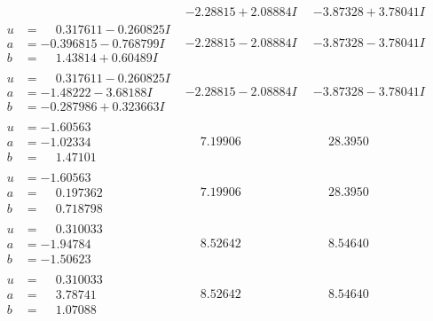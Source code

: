 \documentclass[1p]{elsarticle_modified}
\theoremstyle{definition}
\begin{document}
$$\begin{array}{c|c|c}
 & -2.28815 + 2.08884 I & -3.87328 + 3.78041 I \\ \hline\begin{aligned}
u &= \phantom{-}0.317611 - 0.260825 I \\
a &= -0.396815 - 0.768799 I \\
b &= \phantom{-}1.43814 + 0.60489 I\end{aligned}
 & -2.28815 - 2.08884 I & -3.87328 - 3.78041 I \\ \hline\begin{aligned}
u &= \phantom{-}0.317611 - 0.260825 I \\
a &= -1.48222 - 3.68188 I \\
b &= -0.287986 + 0.323663 I\end{aligned}
 & -2.28815 - 2.08884 I & -3.87328 - 3.78041 I \\ \hline\begin{aligned}
u &= -1.60563\phantom{ +0.000000I} \\
a &= -1.02334\phantom{ +0.000000I} \\
b &= \phantom{-}1.47101\phantom{ +0.000000I}\end{aligned}
 & \phantom{-}7.19906\phantom{ +0.000000I} & \phantom{-}28.3950\phantom{ +0.000000I} \\ \hline\begin{aligned}
u &= -1.60563\phantom{ +0.000000I} \\
a &= \phantom{-}0.197362\phantom{ +0.000000I} \\
b &= \phantom{-}0.718798\phantom{ +0.000000I}\end{aligned}
 & \phantom{-}7.19906\phantom{ +0.000000I} & \phantom{-}28.3950\phantom{ +0.000000I} \\ \hline\begin{aligned}
u &= \phantom{-}0.310033\phantom{ +0.000000I} \\
a &= -1.94784\phantom{ +0.000000I} \\
b &= -1.50623\phantom{ +0.000000I}\end{aligned}
 & \phantom{-}8.52642\phantom{ +0.000000I} & \phantom{-}8.54640\phantom{ +0.000000I} \\ \hline\begin{aligned}
u &= \phantom{-}0.310033\phantom{ +0.000000I} \\
a &= \phantom{-}3.78741\phantom{ +0.000000I} \\
b &= \phantom{-}1.07088\phantom{ +0.000000I}\end{aligned}
 & \phantom{-}8.52642\phantom{ +0.000000I} & \phantom{-}8.54640\phantom{ +0.000000I}\\

\end{array}$$
\end{document}
